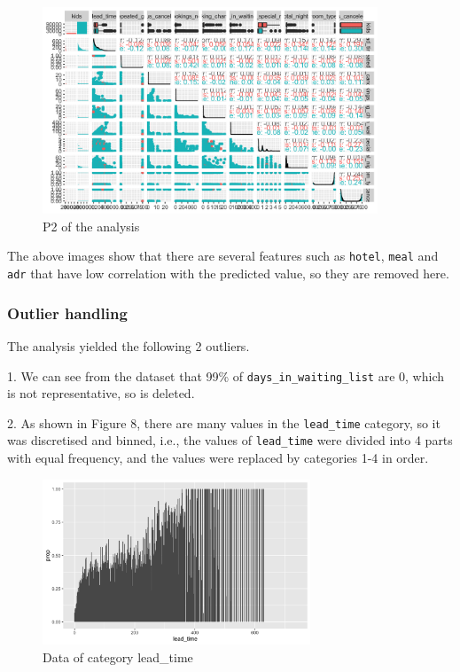 \documentclass{article}
\begin{document}
\begin{figure}[h]
\centering
\includegraphics[width=10cm]{remain2.png} %
\caption{P2 of the analysis} %
\end{figure}

The above images show that there are several features such as \verb|hotel|, \verb|meal| and \verb|adr| that have low correlation with the predicted value, so they are removed here.


\subsubsection{Outlier handling}

The analysis yielded the following 2 outliers.

1. We can see from the dataset that 99\% of \verb|days_in_waiting_list| are 0, which is not representative, so is deleted.

2. As shown in Figure 8, there are many values in the \verb|lead_time| category, so it was discretised and binned, i.e., the values of \verb|lead_time| were divided into 4 parts with equal frequency, and the values were replaced by categories 1-4 in order.

\begin{figure}[h]
\centering
\includegraphics[width=8cm]{lead.png} %
\caption{Data of category lead\_time} %
\end{figure}
\end{document}
